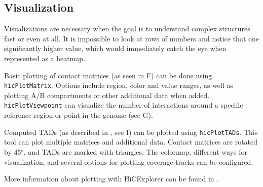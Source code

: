 \subsection{Visualization}\label{sec:visualization}

%
%
%
%

Visualizations are necessary when the goal is to understand complex structures
fast or even at all. It is impossible to look at rows of numbers and notice
that one significantly higher value, which would immediately catch the eye when
represented as a heatmap.

Basic plotting of contact matrices (as seen in F) can be
done using \verb|hicPlotMatrix|. Options include region, color and value
ranges, as well as plotting A/B compartments or other additional data when
added. \verb|hicPlotViewpoint| can visualize the number of interactions around
a specific reference region or point in the genome (see G).

Computed TADs (as described in , see
I) can be plotted using \verb|hicPlotTADs|. This tool
can plot multiple matrices and additional data. Contact matrices are rotated
by 45°, and TADs are marked with triangles. The colormap, different ways for
visualization, and several options for plotting coverage tracks can be
configured.

More information about plotting with HiCExplorer can be found in
\cite{wolff2018galaxy}.
